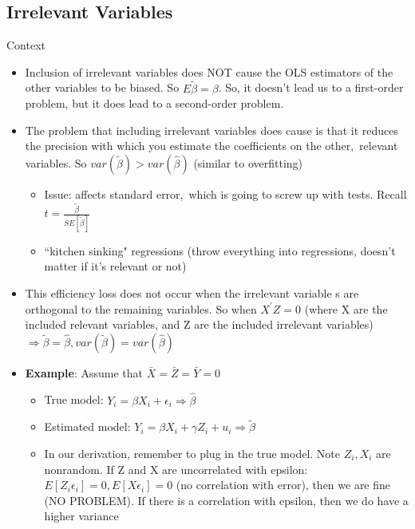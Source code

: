 \documentclass[10pt, oneside]{article}
\begin{document}
\subsection{Irrelevant Variables}
Context
\begin{itemize}
    \item Inclusion of irrelevant variables does NOT cause the OLS estimators of the other variables to be biased. So $E\tilde \beta = \beta$. So, it doesn't lead us to a first-order problem, but it does lead to a second-order problem.
    \item The problem that including irrelevant variables does cause is that it reduces the precision with which you estimate the coefficients on the other, relevant variables. So $var(\tilde \beta) > var(\hat \beta)$ (similar to overfitting)
    \begin{itemize}
        \item Issue: affects standard error, which is going to screw up with tests. Recall $t = \frac{\tilde \beta}{SE[\tilde \beta]}$
        \item ``kitchen sinking" regressions (throw everything into regressions, doesn't matter if it's relevant or not)
    \end{itemize}
    \item This efficiency loss does not occur when the irrelevant variable s are orthogonal to the remaining variables. So when $X^\prime Z=0$ (where X are the included relevant variables, and Z are the included irrelevant variables) $\Rightarrow \tilde \beta = \hat \beta, var(\tilde \beta) = var(\hat \beta)$
    \item \textbf{Example}: Assume that $\bar X =\bar Z = \bar Y = 0$
    \begin{itemize}
        \item True model: $Y_i = \beta X_i + \epsilon_i \Rightarrow \hat \beta$
        \item Estimated model: $Y_i = \beta X_i + \gamma Z_i + u_i \Rightarrow \tilde \beta$
        \item In our derivation, remember to plug in the true model. Note $Z_i, X_i$ are nonrandom. If Z and X are uncorrelated with epsilon: $E[Z_i \epsilon_i] = 0, E[X\epsilon_i] = 0$ (no correlation with error), then we are fine (NO PROBLEM). If there is a correlation with epsilon, then we do have a higher variance
    \end{itemize}
\end{itemize}
\end{document}
